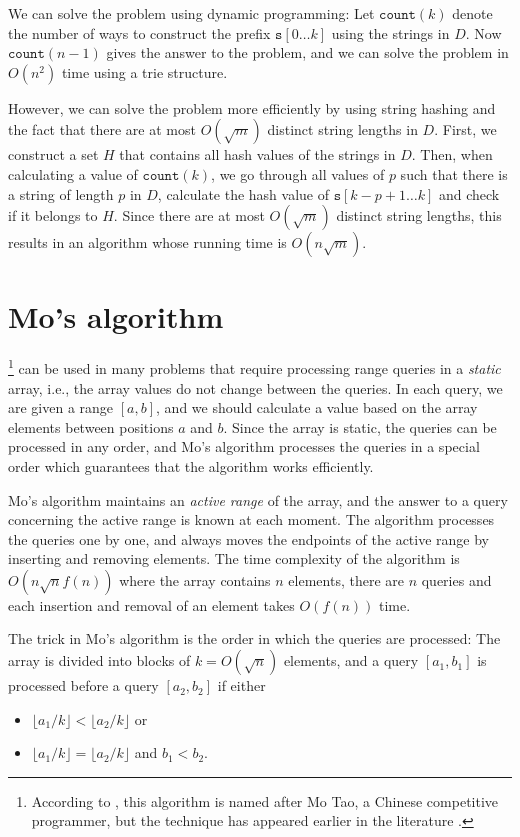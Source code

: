 We can solve the problem using dynamic programming:
Let $\texttt{count}(k)$ denote the number of ways to construct the prefix
$\texttt{s}[0 \ldots k]$ using the strings in $D$.
Now $\texttt{count}(n-1)$ gives the answer to the problem,
and we can solve the problem in $O(n^2)$ time
using a trie structure.

However, we can solve the problem more efficiently
by using string hashing and the fact that there
are at most $O(\sqrt m)$ distinct string lengths in $D$.
First, we construct a set $H$ that contains all
hash values of the strings in $D$.
Then, when calculating a value of $\texttt{count}(k)$,
we go through all values of $p$
such that there is a string of length $p$ in $D$,
calculate the hash value of $\texttt{s}[k-p+1 \ldots k]$
and check if it belongs to $H$.
Since there are at most $O(\sqrt m)$ distinct string lengths,
this results in an algorithm whose running time is $O(n \sqrt m)$.

\section{Mo's algorithm}


\footnote{According to \cite{cod15}, this algorithm
    is named after Mo Tao, a Chinese competitive programmer, but
    the technique has appeared earlier in the literature \cite{ken06}.}
can be used in many problems
that require processing range queries in
a \emph{static} array, i.e., the array values
do not change between the queries.
In each query, we are given a range $[a,b]$,
and we should calculate a value based on the
array elements between positions $a$ and $b$.
Since the array is static,
the queries can be processed in any order,
and Mo's algorithm
processes the queries in a special order which guarantees
that the algorithm works efficiently.

Mo's algorithm maintains an \emph{active range}
of the array, and the answer to a query
concerning the active range is known at each moment.
The algorithm processes the queries one by one,
and always moves the endpoints of the
active range by inserting and removing elements.
The time complexity of the algorithm is
$O(n \sqrt n f(n))$ where the array contains
$n$ elements, there are $n$ queries
and each insertion and removal of an element
takes $O(f(n))$ time.

The trick in Mo's algorithm is the order
in which the queries are processed:
The array is divided into blocks of $k=O(\sqrt n)$
elements, and a query $[a_1,b_1]$
is processed before a query $[a_2,b_2]$
if either
\begin{itemize}
    \item $\lfloor a_1/k \rfloor < \lfloor a_2/k \rfloor$ or
    \item $\lfloor a_1/k \rfloor = \lfloor a_2/k \rfloor$ and $b_1 < b_2$.
\end{itemize}

